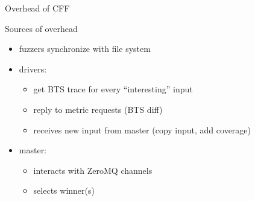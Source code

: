\documentclass[\HandoutMode,table]{beamer}
\begin{document}
\begin{frame}[noframenumbering]
    {Overhead of CFF}
    \begin{block}{Sources of overhead}
        \begin{itemize}
            \item{} fuzzers synchronize with file system
            \item{} drivers:
                \begin{itemize}
                    \item{} get BTS trace for every ``interesting'' input
                    \item{} reply to metric requests (BTS diff)
                    \item{} receives new input from master (copy input, add coverage)
                \end{itemize}
            \item{} master:
                \begin{itemize}
                    \item{} interacts with ZeroMQ channels
                    \item{} selects winner(s)
                \end{itemize}
        \end{itemize}
    \end{block}
    \vspace{\baselineskip}
\end{frame}
\end{document}
